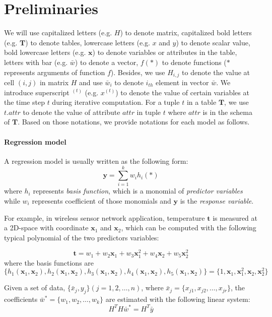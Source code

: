 \section{Preliminaries}\label{sec: pre}
We will use capitalized letters (e.g. $H$) to denote matrix, capitalized bold letters (e.g. $\textbf{T}$) to denote tables, lowercase letters (e.g. $x$ and $y$) to denote scalar value, bold lowercase letters (e.g. $\textbf{x}$) to denote variables or attributes in the table, letters with bar (e.g. $\bar{w}$) to denote a vector, $f(*)$ to denote functions ($*$ represents arguments of function $f$). Besides, we use $H_{i,j}$ to denote the value at cell $(i,j)$ in matrix $H$ and use $\bar{w}_i$ to denote $i_{th}$ element in vector $\bar{w}$. We introduce superscript $^{(t)}$ (e.g. $x^{(t)}$) to denote the value of certain variables at the time step $t$ during iterative computation. For a tuple $t$ in a table $\textbf{T}$, we use $t.attr$ to denote the value of attribute $attr$ in tuple $t$ where $attr$ is in the schema of $\textbf{T}$. Based on those notations, we provide notations for each model as follows.

\paragraph{Regression model}
A regression model is usually written as the following form:
\begin{equation}
\textbf{y}=\sum_{i=1}^kw_ih_i(*)
\end{equation}
where $h_i$ represents {\em basis function}, which is a monomial of {\em predictor variables} while $w_i$ represents coefficient of those monomials and $\textbf{y}$ is the {\em response variable}.

For example, in wireless sensor network application, temperature $\textbf{t}$ is measured at a 2D-space with coordinate $\textbf{x}_1$ and $\textbf{x}_2$, which can be computed with the following typical polynomial of the two predictors variables:

\begin{equation}
\textbf{t}=w_1 + w_2\textbf{x}_1+w_3\textbf{x}_1^2 + w_4\textbf{x}_2+w_5\textbf{x}_2^2
\end{equation}
where the basis functions are $\{h_1(\textbf{x}_1,\textbf{x}_2), h_2(\textbf{x}_1,\textbf{x}_2), h_3(\textbf{x}_1,\textbf{x}_2),h_4(\textbf{x}_1,\textbf{x}_2), h_5(\textbf{x}_1,\textbf{x}_2)\}=\{1, \textbf{x}_1, \textbf{x}_1^2, \textbf{x}_2, \textbf{x}_2^2\}$

Given a set of data, $\{\bar{x}_j,y_j\}(j=1,2,\dots,n)$, where $\bar{x}_j=\{x_{j1},x_{j2}, \dots, x_{jr}\}$, the coefficients $\bar{w}^* = \{w_1,w_2,\dots,w_k\}$ are estimated with the following linear system:
\begin{equation}\label{eq: regression_solve}
    H^TH\bar{w}^*=H^T\bar{y}
\end{equation}

